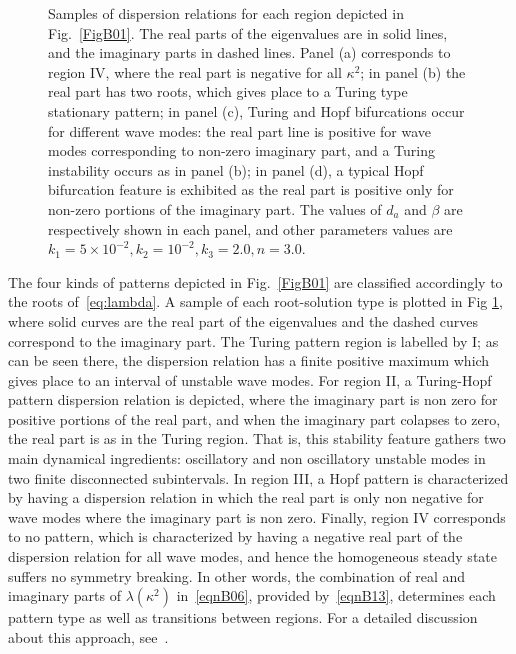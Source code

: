 \documentclass[%
 preprint,
 aip, 
 amsmath,amssymb,
]{revtex4-2}
\begin{document}
\begin{figure}[t!]
	\caption{Samples of dispersion relations for each region depicted in Fig.~\ref{FigB01}. The real parts of the eigenvalues are in solid lines, and the imaginary parts in dashed lines. Panel (a) corresponds to region IV, where the real part is negative for all $\kappa^2$; in panel (b) the real part has two roots, which gives place to a Turing type stationary pattern; in panel (c), Turing and Hopf bifurcations occur for different wave modes: the real part line is positive for wave modes corresponding to non-zero imaginary part, and a Turing instability occurs as in panel (b); in panel (d), a typical Hopf bifurcation feature is exhibited as the real part is positive only for non-zero portions of the imaginary part. The values of $d_a$ and $\beta$ are respectively shown in each panel, and other parameters values are $k_1=5\times10^{-2}, k_2=10^{-2}, k_3=2.0, n=3.0$.}
	\label{FigB02}
\end{figure}

The four kinds of patterns depicted in Fig.~\ref{FigB01} are classified accordingly to the roots of~\eqref{eq:lambda}. A sample of each root-solution type is plotted in Fig \ref{FigB02}, where solid curves are the real part of the eigenvalues and the dashed curves correspond to the imaginary part. The Turing pattern region is labelled by I; as can be seen there, the dispersion relation has a finite positive maximum which gives place to an interval of unstable wave modes. For region II, a Turing-Hopf pattern dispersion relation is depicted, where the imaginary part is non zero for positive portions of the real part, and when the imaginary part colapses to zero, the real part is as in the Turing region. That is, this stability feature gathers two main dynamical ingredients: oscillatory and non oscillatory unstable modes in two finite disconnected subintervals. In region III, a Hopf pattern is characterized by having a dispersion relation in which the real part is only non negative for wave modes where the imaginary part is non zero. Finally, region IV corresponds to no pattern, which is characterized by having a negative real part of the dispersion relation for all wave modes, and hence the homogeneous steady state suffers no symmetry breaking. In other words, the combination of real and imaginary parts of $\lambda(\kappa^2)$ in~\eqref{eqnB06}, provided by~\eqref{eqnB13}, determines each pattern type as well as transitions between regions. For a detailed discussion about this approach, see~\cite{liu}.
\end{document}
